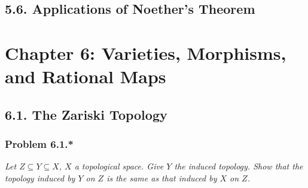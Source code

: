 \documentclass{article}
\begin{document}



\subsection*{5.6. Applications of Noether's Theorem \\}






\newpage
\section*{Chapter 6: Varieties, Morphisms, and Rational Maps \\}



\subsection*{6.1. The Zariski Topology \\}



\subsubsection*{Problem 6.1.*}
\emph{Let $Z \subseteq Y \subseteq X$, $X$ a topological space.
Give $Y$ the induced topology.
Show that the topology induced by $Y$ on $Z$ is the same as that induced by $X$ on $Z$.} \\
\end{document}

